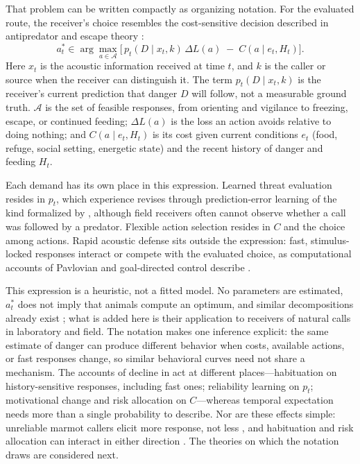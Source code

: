 That problem can be written compactly as organizing notation. For the evaluated route, the receiver's choice resembles the cost-sensitive decision described in antipredator and escape theory \citep{LimaDill1990,YdenbergDill1986}:
\begin{equation}
a_t^{*}\in\arg\max_{a\in\mathcal{A}}\Big[\,p_t(D\mid x_t,k)\,\Delta L(a)\;-\;C(a\mid e_t,H_t)\Big].
\label{eq:action}
\end{equation}
Here $x_t$ is the acoustic information received at time $t$, and $k$ is the caller or source when the receiver can distinguish it. The term $p_t(D\mid x_t,k)$ is the receiver's current prediction that danger $D$ will follow, not a measurable ground truth. $\mathcal{A}$ is the set of feasible responses, from orienting and vigilance to freezing, escape, or continued feeding; $\Delta L(a)$ is the loss an action avoids relative to doing nothing; and $C(a\mid e_t,H_t)$ is its cost given current conditions $e_t$ (food, refuge, social setting, energetic state) and the recent history of danger and feeding $H_t$.

Each demand has its own place in this expression. Learned threat evaluation resides in $p_t$, which experience revises through prediction-error learning of the kind formalized by \citet{RescorlaWagner1972}, although field receivers often cannot observe whether a call was followed by a predator. Flexible action selection resides in $C$ and the choice among actions. Rapid acoustic defense sits outside the expression: fast, stimulus-locked responses interact or compete with the evaluated choice, as computational accounts of Pavlovian and goal-directed control describe \citep{DayanEtAl2006,RigoliEtAl2016}.

This expression is a heuristic, not a fitted model. No parameters are estimated, $a_t^{*}$ does not imply that animals compute an optimum, and similar decompositions already exist \citep{RigoliEtAl2016}; what is added here is their application to receivers of natural calls in laboratory and field. The notation makes one inference explicit: the same estimate of danger can produce different behavior when costs, available actions, or fast responses change, so similar behavioral curves need not share a mechanism. The accounts of decline in  act at different places---habituation on history-sensitive responses, including fast ones; reliability learning on $p_t$; motivational change and risk allocation on $C$---whereas temporal expectation needs more than a single probability to describe. Nor are these effects simple: unreliable marmot callers elicit more response, not less \citep{BlumsteinEtAl2004}, and habituation and risk allocation can interact in either direction \citep{Sirot2010}. The theories on which the notation draws are considered next.

